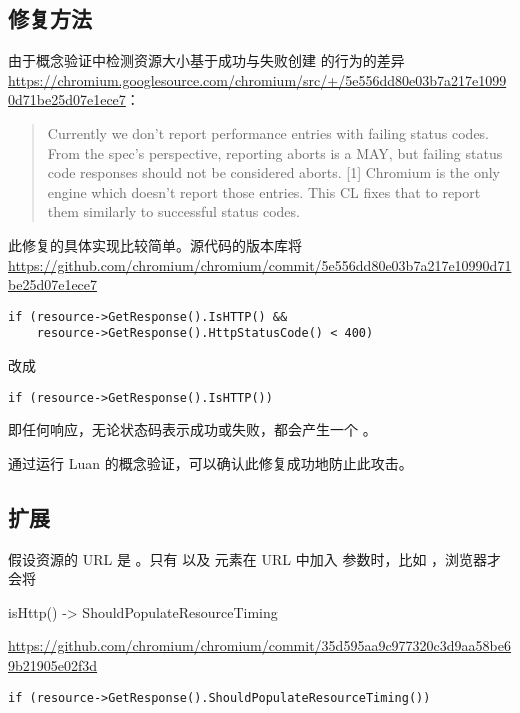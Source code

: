 \subsection{修复方法}

由于概念验证中检测资源大小基于成功与失败创建  的行为的差异 \url{https://chromium.googlesource.com/chromium/src/+/5e556dd80e03b7a217e10990d71be25d07e1ece7}：

\begin{quote}
    Currently we don't report performance entries with failing status codes.
    From the spec's perspective, reporting aborts is a MAY, but failing
    status code responses should not be considered aborts. [1]
    Chromium is the only engine which doesn't report those entries.
    This CL fixes that to report them similarly to successful status codes.
\end{quote}

此修复的具体实现比较简单。源代码的版本库将 \url{https://github.com/chromium/chromium/commit/5e556dd80e03b7a217e10990d71be25d07e1ece7}

\begin{lstlisting}
if (resource->GetResponse().IsHTTP() &&
    resource->GetResponse().HttpStatusCode() < 400)
\end{lstlisting}

改成 

\begin{lstlisting}
if (resource->GetResponse().IsHTTP())
\end{lstlisting}

即任何响应，无论状态码表示成功或失败，都会产生一个 。

通过运行 Luan 的概念验证，可以确认此修复成功地防止此攻击。

\subsection{扩展}

假设资源的 URL 是 。只有  以及  元素在 URL 中加入  参数时，比如 ，浏览器才会将

isHttp() -> ShouldPopulateResourceTiming

\url{https://github.com/chromium/chromium/commit/35d595aa9c977320c3d9aa58be69b21905e02f3d}

\begin{lstlisting}
if (resource->GetResponse().ShouldPopulateResourceTiming())
\end{lstlisting}

